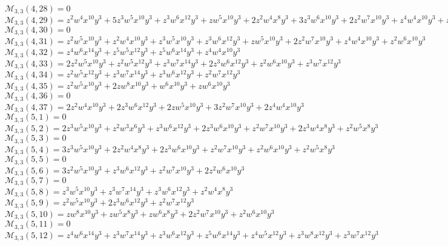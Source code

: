 $\mathcal{M}_{3,3}(4,28)=0$\\
$\mathcal{M}_{3,3}(4,29)=z^2w^4x^{10}y^3+5z^3w^5x^{10}y^3+z^3w^6x^{12}y^3+zw^5x^{10}y^3+2z^2w^4x^8y^3+3z^3w^6x^{10}y^3+2z^2w^7x^{10}y^3+z^4w^4x^{10}y^3+z^2w^5x^8y^3$\\
$\mathcal{M}_{3,3}(4,30)=0$\\
$\mathcal{M}_{3,3}(4,31)=z^2w^5x^{10}y^3+z^2w^4x^{10}y^3+z^3w^5x^{10}y^3+z^3w^6x^{12}y^3+zw^5x^{10}y^3+2z^2w^7x^{10}y^3+z^4w^4x^{10}y^3+z^2w^6x^{10}y^3$\\
$\mathcal{M}_{3,3}(4,32)=z^4w^6x^{14}y^3+z^5w^5x^{12}y^3+z^5w^6x^{14}y^3+z^4w^4x^{10}y^3$\\
$\mathcal{M}_{3,3}(4,33)=2z^2w^5x^{10}y^3+z^2w^5x^{12}y^3+z^3w^7x^{14}y^3+2z^3w^6x^{12}y^3+z^2w^6x^{10}y^3+z^3w^7x^{12}y^3$\\
$\mathcal{M}_{3,3}(4,34)=z^2w^5x^{12}y^3+z^3w^7x^{14}y^3+z^3w^6x^{12}y^3+z^2w^7x^{12}y^3$\\
$\mathcal{M}_{3,3}(4,35)=z^2w^5x^{10}y^3+2zw^8x^{10}y^3+w^6x^{10}y^3+zw^6x^{10}y^3$\\
$\mathcal{M}_{3,3}(4,36)=0$\\
$\mathcal{M}_{3,3}(4,37)=2z^2w^4x^{10}y^3+2z^3w^6x^{12}y^3+2zw^5x^{10}y^3+3z^2w^7x^{10}y^3+2z^4w^4x^{10}y^3$\\
$\mathcal{M}_{3,3}(5,1)=0$\\
$\mathcal{M}_{3,3}(5,2)=2z^3w^5x^{10}y^3+z^2w^3x^6y^3+z^3w^6x^{12}y^3+2z^3w^6x^{10}y^3+z^2w^7x^{10}y^3+2z^3w^4x^8y^3+z^2w^5x^8y^3$\\
$\mathcal{M}_{3,3}(5,3)=0$\\
$\mathcal{M}_{3,3}(5,4)=3z^3w^5x^{10}y^3+2z^2w^4x^8y^3+2z^3w^6x^{10}y^3+z^2w^7x^{10}y^3+z^2w^6x^{10}y^3+z^2w^5x^8y^3$\\
$\mathcal{M}_{3,3}(5,5)=0$\\
$\mathcal{M}_{3,3}(5,6)=3z^2w^5x^{10}y^3+z^3w^6x^{12}y^3+z^2w^7x^{10}y^3+2z^2w^6x^{10}y^3$\\
$\mathcal{M}_{3,3}(5,7)=0$\\
$\mathcal{M}_{3,3}(5,8)=z^3w^5x^{10}y^3+z^3w^7x^{14}y^3+z^3w^6x^{12}y^3+z^2w^4x^8y^3$\\
$\mathcal{M}_{3,3}(5,9)=z^2w^5x^{10}y^3+2z^3w^6x^{12}y^3+z^2w^7x^{12}y^3$\\
$\mathcal{M}_{3,3}(5,10)=zw^8x^{10}y^3+zw^5x^8y^3+zw^6x^8y^3+2z^2w^7x^{10}y^3+z^2w^6x^{10}y^3$\\
$\mathcal{M}_{3,3}(5,11)=0$\\
$\mathcal{M}_{3,3}(5,12)=z^4w^6x^{14}y^3+z^3w^7x^{14}y^3+z^3w^6x^{12}y^3+z^5w^6x^{14}y^3+z^4w^5x^{12}y^3+z^3w^8x^{12}y^3+z^3w^7x^{12}y^3$\\
